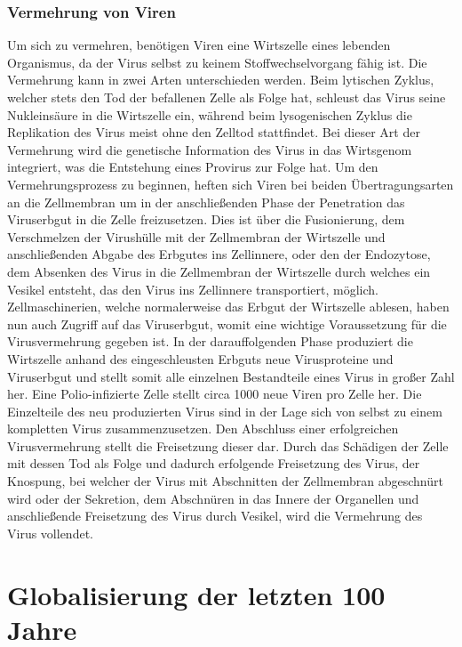 \documentclass[12pt]{article}
\begin{document}
\subsubsection{Vermehrung von Viren}
Um sich zu vermehren, benötigen Viren eine Wirtszelle eines lebenden Organismus, da der Virus selbst zu keinem Stoffwechselvorgang fähig ist. Die Vermehrung kann in zwei Arten unterschieden werden. Beim lytischen Zyklus, welcher stets den Tod der befallenen Zelle als Folge hat, schleust das Virus seine Nukleinsäure in die Wirtszelle ein, während beim lysogenischen Zyklus die Replikation des Virus meist ohne den Zelltod stattfindet. Bei dieser Art der Vermehrung wird die genetische Information des Virus in das Wirtsgenom integriert, was die Entstehung eines Provirus zur Folge hat. Um den Vermehrungsprozess zu beginnen, heften sich Viren bei beiden Übertragungsarten an die Zellmembran um in der anschließenden Phase der Penetration das Viruserbgut in die Zelle freizusetzen. Dies ist über die Fusionierung, dem Verschmelzen der Virushülle mit der Zellmembran der Wirtszelle und anschließenden Abgabe des Erbgutes ins Zellinnere, oder den der Endozytose, dem Absenken des Virus in die Zellmembran der Wirtszelle durch welches ein Vesikel entsteht, das den Virus ins Zellinnere transportiert, möglich. Zellmaschinerien, welche normalerweise das Erbgut der Wirtszelle ablesen, haben nun auch Zugriff auf das Viruserbgut, womit eine wichtige Voraussetzung für die Virusvermehrung gegeben ist. In der darauffolgenden Phase produziert die Wirtszelle anhand des eingeschleusten Erbguts neue Virusproteine und Viruserbgut und stellt somit alle einzelnen Bestandteile eines Virus in großer Zahl her. Eine Polio-infizierte Zelle stellt circa 1000 neue Viren pro Zelle her. Die Einzelteile des neu produzierten Virus sind in der Lage sich von selbst zu einem kompletten Virus zusammenzusetzen. Den Abschluss einer erfolgreichen Virusvermehrung stellt die Freisetzung dieser dar. Durch das Schädigen der Zelle mit dessen Tod als Folge und dadurch erfolgende Freisetzung des Virus, der Knospung, bei welcher der Virus mit Abschnitten der Zellmembran abgeschnürt wird oder der Sekretion, dem Abschnüren in das Innere der Organellen und anschließende Freisetzung des Virus durch Vesikel, wird die Vermehrung des Virus vollendet.

\section{Globalisierung der letzten 100 Jahre}\label{sec:Globalisierung}
\end{document}
